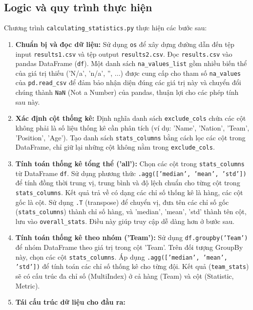 \documentclass[12pt, a4paper]{report}
\begin{document}
\subsection{Logic và quy trình thực hiện}
Chương trình \texttt{calculating\_statistics.py} thực hiện các bước sau:
\begin{enumerate}[label=\textbf{Bước \arabic*:}, leftmargin=*]
    \item \textbf{Chuẩn bị và đọc dữ liệu:}
    Sử dụng \texttt{os} để xây dựng đường dẫn đến tệp input \texttt{results1.csv} và tệp output \texttt{results2.csv}.
    Đọc \texttt{results.csv} vào pandas DataFrame (\texttt{df}).
    Một danh sách \texttt{na\_values\_list} gồm nhiều biến thể của giá trị thiếu ('N/a', 'n/a', '', ...) được cung cấp cho tham số \texttt{na\_values} của \texttt{pd.read\_csv} để đảm bảo nhận diện đúng các giá trị này và chuyển đổi chúng thành \texttt{NaN} (Not a Number) của pandas, thuận lợi cho các phép tính sau này.
    \item \textbf{Xác định cột thống kê:}
    Định nghĩa danh sách \texttt{exclude\_cols} chứa các cột không phải là số liệu thống kê cần phân tích (ví dụ: 'Name', 'Nation', 'Team', 'Position', 'Age').
    Tạo danh sách \texttt{stats\_columns} bằng cách lọc các cột trong DataFrame, chỉ giữ lại những cột không nằm trong \texttt{exclude\_cols}.
    \item \textbf{Tính toán thống kê tổng thể ('all'):}
    Chọn các cột trong \texttt{stats\_columns} từ DataFrame \texttt{df}.
    Sử dụng phương thức \texttt{.agg(['median', 'mean', 'std'])} để tính đồng thời trung vị, trung bình và độ lệch chuẩn cho từng cột trong \texttt{stats\_columns}.
    Kết quả trả về có dạng các chỉ số thống kê là hàng, các cột gốc là cột.
    Sử dụng \texttt{.T} (transpose) để chuyển vị, đưa tên các chỉ số gốc (\texttt{stats\_columns}) thành chỉ số hàng, và 'median', 'mean', 'std' thành tên cột, lưu vào \texttt{overall\_stats}.
    Điều này giúp truy cập dễ dàng hơn ở bước sau.
    \item \textbf{Tính toán thống kê theo nhóm ('Team'):}
    Sử dụng \texttt{df.groupby('Team')} để nhóm DataFrame theo giá trị trong cột 'Team'.
    Trên đối tượng GroupBy này, chọn các cột \texttt{stats\_columns}.
    Áp dụng \texttt{.agg(['median', 'mean', 'std'])} để tính toán các chỉ số thống kê cho từng đội.
    Kết quả (\texttt{team\_stats}) sẽ có cấu trúc đa chỉ số (MultiIndex) ở cả hàng (Team) và cột (Statistic, Metric).
    \item \textbf{Tái cấu trúc dữ liệu cho đầu ra:}
    \begin{itemize}[leftmargin=0em]

\end{itemize}
\end{enumerate}
\end{document}
